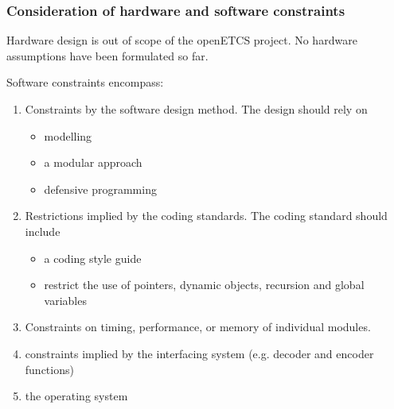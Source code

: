 \subsubsection{Consideration of hardware and software constraints}



Hardware design is out of scope of the openETCS project. 
No hardware assumptions have been formulated so far.

\noindent 
Software constraints encompass:

\begin{enumerate}
   \item Constraints by the software design method. 
         The design should rely on
   \begin{itemize}
   \item modelling
   \item a modular approach
   \item defensive programming
   \end{itemize}

   \item Restrictions implied by the coding standards.
         The coding standard should include
   \begin{itemize}
   \item a coding style guide
   \item restrict the use of pointers, dynamic objects, recursion and global variables
   \end{itemize}

   \item Constraints on timing, performance, or memory of  individual modules.
   \item constraints implied by 
         the interfacing system (e.g. decoder and encoder functions)
   \item the operating system
\end{enumerate}



